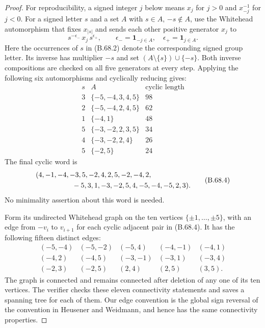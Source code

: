 \begin{proof}
For reproducibility, a signed integer $j$ below means
$x_j$ for $j>0$ and $x_{-j}^{-1}$ for $j<0$.
For a signed letter $s$ and a set $A$ with
$s\in A$, $-s\notin A$, use the Whitehead automorphism
that fixes $x_{|s|}$ and sends each other positive
generator $x_j$ to
\[
       s^{-\epsilon_-}\,x_j\,s^{\epsilon_+},\qquad
       \epsilon_-=\mathbf1_{-j\in A},\quad
       \epsilon_+=\mathbf1_{j\in A}.
                                                               \tag{B.68.2}
\]
Here the occurrences of $s$ in (B.68.2) denote the
corresponding signed group letter.  Its inverse has
multiplier $-s$ and set $(A\setminus\{s\})\cup\{-s\}$.
Both inverse compositions are checked on all five
generators at every step.  Applying the following
six automorphisms and cyclically reducing gives:
\[
\begin{array}{c|c|c}
s&A&\text{cyclic length}\\ \hline
3&\{-5,-4,3,4,5\}&98\\
2&\{-5,-4,2,4,5\}&62\\
1&\{-4,1\}&48\\
5&\{-3,-2,2,3,5\}&34\\
4&\{-3,-2,2,4\}&26\\
5&\{-2,5\}&24
\end{array}                                                     \tag{B.68.3}
\]
The final cyclic word is
\[
\begin{split}
 &(4,-1,-4,-3,5,-2,4,2,5,-2,-4,2,\\
 &\hspace{18mm}-5,3,1,-3,-2,5,4,-5,-4,-5,2,3).
\end{split}                                                     \tag{B.68.4}
\]
No minimality assertion about this word is needed.

Form its undirected Whitehead graph on the ten vertices
$\{\pm1,\ldots,\pm5\}$, with an edge from $-v_i$ to
$v_{i+1}$ for each cyclic adjacent pair in (B.68.4).
It has the following fifteen distinct edges:
\[
\begin{array}{rrrrr}
(-5,-4)&(-5,-2)&(-5,4)&(-4,-1)&(-4,1)\\
(-4,2)&(-4,5)&(-3,-1)&(-3,1)&(-3,4)\\
(-2,3)&(-2,5)&(2,4)&(2,5)&(3,5).
\end{array}                                                     \tag{B.68.5}
\]
The graph is connected and remains connected after
deletion of any one of its ten vertices.  The verifier
checks these eleven connectivity statements and saves
a spanning tree for each of them.
Our edge convention is the global sign reversal of
the convention in Heusener and Weidmann, and hence
has the same connectivity properties.


\end{proof}
